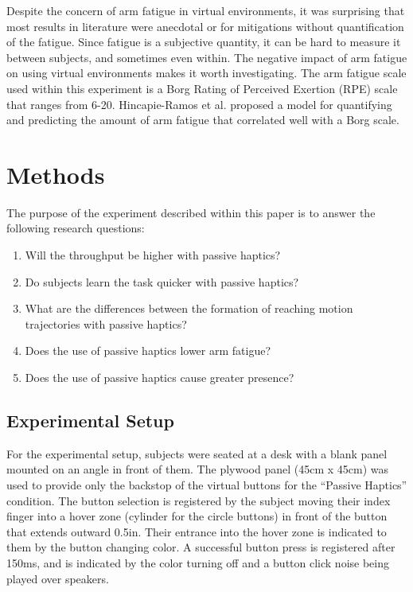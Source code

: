 Despite the concern of arm fatigue in virtual environments\cite{burdea_virtual_2004}, it was surprising that most results in literature were anecdotal or for mitigations without quantification of the fatigue.
Since fatigue is a subjective quantity, it can be hard to measure it between subjects, and sometimes even within.
The negative impact of arm fatigue on using virtual environments makes it worth investigating.
The arm fatigue scale used within this experiment is a Borg Rating of Perceived Exertion (RPE) scale that ranges from 6-20\cite{borg_borg_1998}.
Hincapie-Ramos et al.\cite{hincapie_consumed_2014} proposed a model for quantifying and predicting the amount of arm fatigue that correlated well with a Borg scale.

\section{Methods}

The purpose of the experiment described within this paper is to answer the following research questions:

\begin{enumerate}
    \item Will the throughput be higher with passive haptics?
    \item Do subjects learn the task quicker with passive haptics?
    \item What are the differences between the formation of reaching motion trajectories with passive haptics?
    \item Does the use of passive haptics lower arm fatigue?
    \item Does the use of passive haptics cause greater presence?
\end{enumerate}

\subsection{Experimental Setup}

For the experimental setup, subjects were seated at a desk with a blank panel mounted on an angle in front of them.
The plywood panel (45cm x 45cm) was used to provide only the backstop of the virtual buttons for the ``Passive Haptics'' condition.
The button selection is registered by the subject moving their index finger into a hover zone (cylinder for the circle buttons) in front of the button that extends outward 0.5in.
Their entrance into the hover zone is indicated to them by the button changing color.
A successful button press is registered after 150ms, and is indicated by the color turning off and a button click noise being played over speakers.

